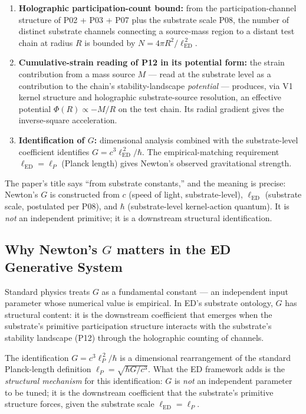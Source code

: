 \documentclass[11pt,a4paper]{article}
\begin{document}
\begin{enumerate}[noitemsep]
\item \textbf{Holographic participation-count bound:} from the participation-channel structure of P02 + P03 + P07 plus the substrate scale P08, the number of distinct substrate channels connecting a source-mass region to a distant test chain at radius $R$ is bounded by $N = 4\pi R^2/\ell_\mathrm{ED}^{\,2}$.
\item \textbf{Cumulative-strain reading of P12 in its potential form:} the strain contribution from a mass source $M$ --- read at the substrate level as a contribution to the chain's stability-landscape \emph{potential} --- produces, via V1 kernel structure and holographic substrate-source resolution, an effective potential $\Phi(R) \propto -M/R$ on the test chain. Its radial gradient gives the inverse-square acceleration.
\item \textbf{Identification of $G$:} dimensional analysis combined with the substrate-level coefficient identifies $G = c^3\ell_\mathrm{ED}^{\,2}/\hbar$. The empirical-matching requirement $\ell_\mathrm{ED} = \ell_P$ (Planck length) gives Newton's observed gravitational strength.
\end{enumerate}

The paper's title says ``from substrate constants,'' and the meaning is precise: Newton's $G$ is constructed from $c$ (speed of light, substrate-level), $\ell_\mathrm{ED}$ (substrate scale, postulated per P08), and $\hbar$ (substrate-level kernel-action quantum). It is \emph{not} an independent primitive; it is a downstream structural identification.

\subsection{Why Newton's $G$ matters in the ED Generative System}

Standard physics treats $G$ as a fundamental constant --- an independent input parameter whose numerical value is empirical. In ED's substrate ontology, $G$ has structural content: it is the downstream coefficient that emerges when the substrate's primitive participation structure interacts with the substrate's stability landscape (P12) through the holographic counting of channels.

The identification $G = c^3\ell_P^{\,2}/\hbar$ is a dimensional rearrangement of the standard Planck-length definition $\ell_P = \sqrt{\hbar G/c^3}$. What the ED framework adds is the \emph{structural mechanism} for this identification: $G$ is \emph{not} an independent parameter to be tuned; it is the downstream coefficient that the substrate's primitive structure forces, given the substrate scale $\ell_\mathrm{ED} = \ell_P$.
\end{document}
